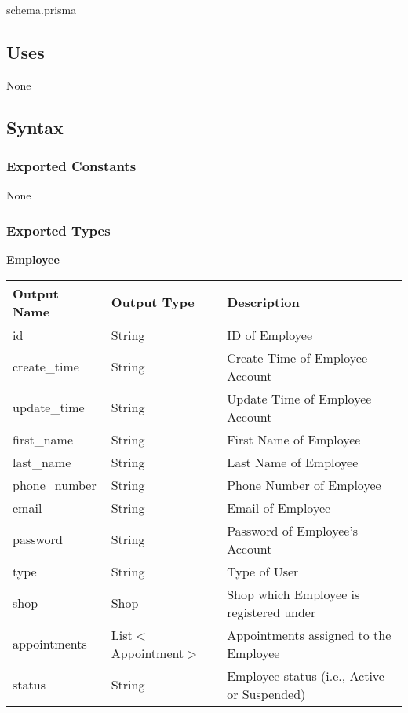 \documentclass[12pt, titlepage]{article}
\begin{document}
schema.prisma

\subsection{Uses}

None

\subsection{Syntax}

\subsubsection{Exported Constants}

None

\subsubsection{Exported Types}

\textbf{Employee}

\begin{table}[H]
	\begin{tabular}{|p{}|p{}|p{}|}
		\hline
		\textbf{Output Name} & \textbf{Output Type}  & \textbf{Description}                        \\
		\hline
		id                   & String                & ID of Employee                              \\
		\hline
		create\_time         & String                & Create Time of Employee Account             \\
		\hline
		update\_time         & String                & Update Time of Employee Account             \\
		\hline
		first\_name          & String                & First Name of Employee                      \\
		\hline
		last\_name           & String                & Last Name of Employee                       \\
		\hline
		phone\_number        & String                & Phone Number of Employee                    \\
		\hline
		email                & String                & Email of Employee                           \\
		\hline
		password             & String                & Password of Employee's Account              \\
		\hline
		type                 & String                & Type of User                                \\
		\hline
		shop                 & Shop                  & Shop which Employee is registered under     \\
		\hline
		appointments         & List$<$Appointment$>$ & Appointments assigned to the Employee       \\
		\hline
		status               & String                & Employee status (i.e., Active or Suspended) \\
		\hline
	\end{tabular}
\end{table}
\end{document}
